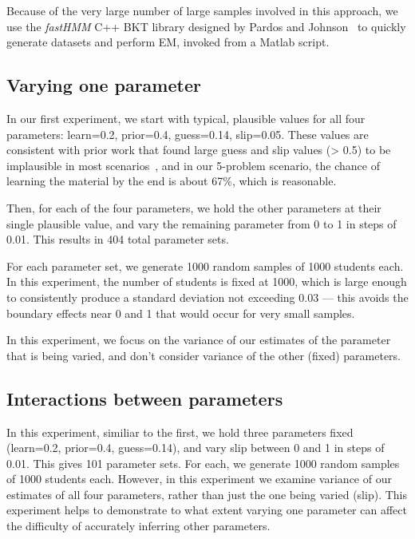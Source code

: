 \documentclass{edm_template}
\begin{document}
Because of the very large number of large samples involved in this approach, we use the \emph{fastHMM} C++ BKT library designed by Pardos and Johnson~\cite{pardosjohnson} to quickly generate datasets and perform EM, invoked from a Matlab script.

\subsection{Varying one parameter}
\label{variance1method}

In our first experiment, we start with typical, plausible values for all four parameters: learn=0.2, prior=0.4, guess=0.14, slip=0.05. These values are consistent with prior work that found large guess and slip values (> 0.5) to be implausible in most scenarios~\cite{ritter}, and in our 5-problem scenario, the chance of learning the material by the end is about 67\%, which is reasonable.

Then, for each of the four parameters, we hold the other parameters at their single plausible value, and vary the remaining parameter from 0 to 1 in steps of 0.01. This results in 404 total parameter sets.

For each parameter set, we generate 1000 random samples of 1000 students each. In this experiment, the number of students is fixed at 1000, which is large enough to consistently produce a standard deviation not exceeding 0.03 --- this avoids the boundary effects near 0 and 1 that would occur for very small samples.

In this experiment, we focus on the variance of our estimates of the parameter that is being varied, and don't consider variance of the other (fixed) parameters. 

\subsection{Interactions between parameters}
\label{variance2method}

In this experiment, similiar to the first, we hold three parameters fixed (learn=0.2, prior=0.4, guess=0.14), and vary slip between 0 and 1 in steps of 0.01. This gives 101 parameter sets. For each, we generate 1000 random samples of 1000 students each. However, in this experiment we examine variance of our estimates of all four parameters, rather than just the one being varied (slip). This experiment helps to demonstrate to what extent varying one parameter can affect the difficulty of accurately inferring other parameters.
\end{document}
